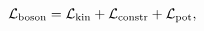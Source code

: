 \begin{equation}
 {\cal L}_{\rm boson} = 
 {\cal L}_{\rm kin} + 
 {\cal L}_{\rm constr} + 
 {\cal L}_{\rm pot},  
\label{eq:N1U1boson}
\end{equation}

